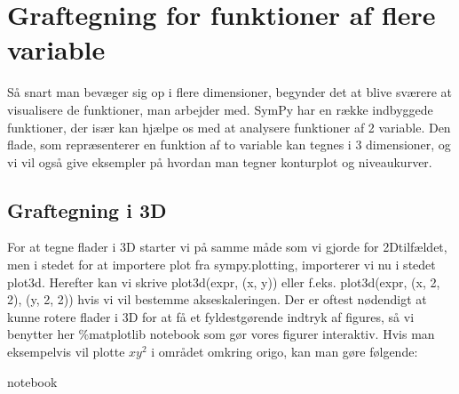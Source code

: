 \documentclass[letterpaper,10pt,english]{jupyterBook}
\begin{document}
\section{Graftegning for funktioner af flere variable}
\label{\detokenize{notebooks/sympy/Notebook_FlereVar_plot:graftegning-for-funktioner-af-flere-variable}}\label{\detokenize{notebooks/sympy/Notebook_FlereVar_plot::doc}}
Så snart man bevæger sig op i flere dimensioner, begynder det at blive sværere at visualisere de funktioner, man arbejder med. SymPy har en række indbyggede funktioner, der især kan hjælpe os med at analysere funktioner af 2 variable. Den flade, som repræsenterer en funktion af to variable kan tegnes i 3 dimensioner, og vi vil også give eksempler på hvordan man tegner konturplot og niveaukurver.


\subsection{Graftegning i 3D}
\label{\detokenize{notebooks/sympy/Notebook_FlereVar_plot:graftegning-i-3d}}
For at tegne flader i 3D starter vi på samme måde som vi gjorde for 2D\sphinxhyphen{}tilfældet, men i stedet for at importere plot fra sympy.plotting, importerer vi nu i stedet plot3d. Herefter kan vi skrive plot3d(expr, (x, y)) eller f.eks. plot3d(expr, (x, \sphinxhyphen{}2, 2), (y, \sphinxhyphen{}2, 2)) hvis vi vil bestemme akseskaleringen. Der er oftest nødendigt at kunne rotere flader i 3D for at få et fyldestgørende indtryk af figures, så vi benytter her \%matplotlib notebook som gør vores figurer interaktiv. Hvis man eksempelvis vil plotte \(xy^2\) i området omkring origo, kan man gøre følgende:

\begin{sphinxVerbatim}[commandchars=\\\{\}]
            
 notebook  

                               
           
\end{sphinxVerbatim}
\end{document}
